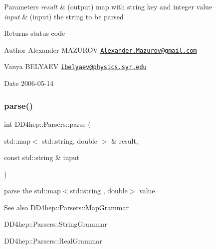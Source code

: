 \begin{DoxyParams}{Parameters}
{\em result} & (output) map with string key and integer value \\
\hline
{\em input} & (input) the string to be parsed \\
\hline
\end{DoxyParams}
\begin{DoxyReturn}{Returns}
status code
\end{DoxyReturn}
\begin{DoxyAuthor}{Author}
Alexander M\+A\+Z\+U\+R\+OV \href{mailto:Alexander.Mazurov@gmail.com}{\tt Alexander.\+Mazurov@gmail.\+com} 

Vanya B\+E\+L\+Y\+A\+EV \href{mailto:ibelyaev@physics.syr.edu}{\tt ibelyaev@physics.\+syr.\+edu} 
\end{DoxyAuthor}
\begin{DoxyDate}{Date}
2006-\/05-\/14 
\end{DoxyDate}
\hypertarget{namespace_d_d4hep_1_1_parsers_a3bb4178f3175f409b144ff5629463c14}{}\label{namespace_d_d4hep_1_1_parsers_a3bb4178f3175f409b144ff5629463c14} 
\subsubsection{\texorpdfstring{parse()}{parse()}\hspace{0.1cm}{\footnotesize\ttfamily [10/21]}}
{\footnotesize\ttfamily int D\+D4hep\+::\+Parsers\+::parse (\begin{DoxyParamCaption}\item[{std\+::map$<$ std\+::string, double $>$ \&}]{result,  }\item[{const std\+::string \&}]{input }\end{DoxyParamCaption})}



parse the {\ttfamily std\+::map$<$std\+::string , double$>$} value 

\begin{DoxySeeAlso}{See also}
D\+D4hep\+::\+Parsers\+::\+Map\+Grammar 

D\+D4hep\+::\+Parsers\+::\+String\+Grammar 

D\+D4hep\+::\+Parsers\+::\+Real\+Grammar 
\end{DoxySeeAlso}

